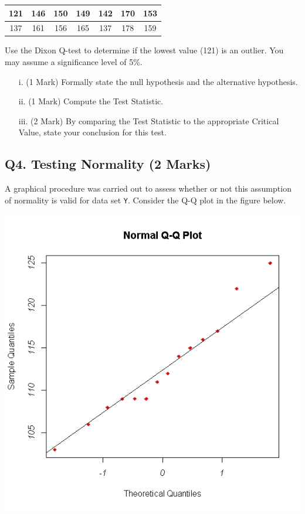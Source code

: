 \documentclass[a4paper,12pt]{article}
\begin{document}
\begin{center}
\begin{tabular}{|c|c|c|c|c|c|c|}
\hline
121 & 146 & 150 &149 &142 &170& 153\\ \hline
 137 & 161 & 156& 165& 137& 178& 159
\\ \hline
\end{tabular}
\end{center}
Use the Dixon Q-test to determine if the lowest value (121) is an outlier. You may assume a significance level of 5\%.

\begin{itemize}
\item[i.] (1 Mark) Formally state the null hypothesis and the alternative hypothesis.
\item[ii.] (1 Mark) Compute the Test Statistic.
\item[iii.] (2 Mark) By comparing the Test Statistic to the appropriate Critical Value, state your conclusion for this test.
\end{itemize}

\subsection*{Q4. Testing Normality (2 Marks)} %
A graphical procedure was carried out to assess whether or not this assumption of normality is valid for data set \texttt{Y}. Consider the Q-Q plot in the figure below.

\begin{center}
	\includegraphics[scale=0.45]{images/Q5examQQplot}
\end{center}
\end{document}
